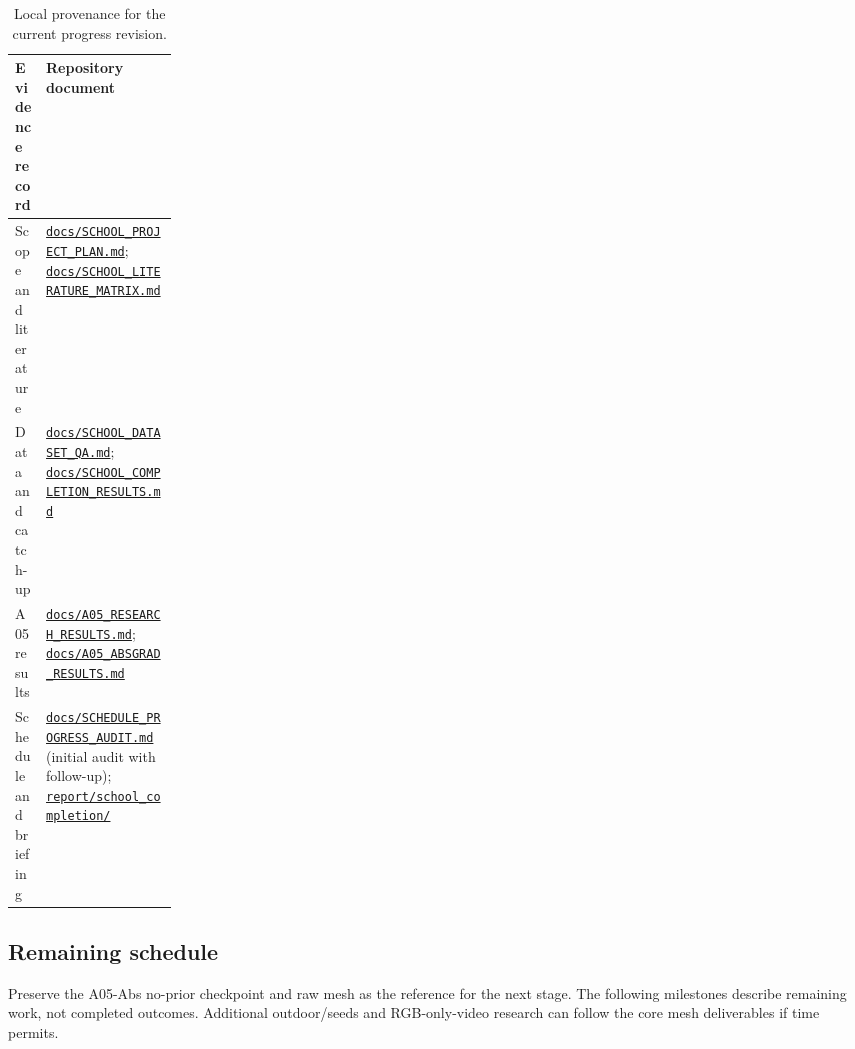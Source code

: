 \documentclass[11pt,a4paper]{article}
\begin{document}
\begin{table}[!ht]
\centering\small
\begin{tabularx}{\linewidth}{@{}p{0.19\linewidth}Y@{}}
\toprule
\textbf{Evidence record} & \textbf{Repository document} \\
\midrule
Scope and literature & \href{run:docs/SCHOOL_PROJECT_PLAN_20261109.md}{\texttt{docs/SCHOOL\_PROJECT\_PLAN.md}};
\href{run:docs/SCHOOL_LITERATURE_MATRIX_20261109.md}{\texttt{docs/SCHOOL\_LITERATURE\_MATRIX.md}} \\
Data and catch-up & \href{run:docs/SCHOOL_DATASET_QA_20261109.md}{\texttt{docs/SCHOOL\_DATASET\_QA.md}};
\href{run:docs/SCHOOL_COMPLETION_RESULTS_20261109.md}{\texttt{docs/SCHOOL\_COMPLETION\_RESULTS.md}} \\
A05 results & \href{run:docs/A05_RESEARCH_RESULTS_20261107.md}{\texttt{docs/A05\_RESEARCH\_RESULTS.md}};
\href{run:docs/A05_ABSGRAD_RESULTS_20261107.md}{\texttt{docs/A05\_ABSGRAD\_RESULTS.md}} \\
Schedule and briefing & \href{run:docs/SCHEDULE_PROGRESS_AUDIT_20261109.md}{\texttt{docs/SCHEDULE\_PROGRESS\_AUDIT.md}}
(initial audit with follow-up); \href{run:report/school_completion_20261109/}{\texttt{report/school\_completion/}} \\
\bottomrule
\end{tabularx}
\caption{Local provenance for the current progress revision.}
\end{table}

\clearpage
\subsection{Remaining schedule}
Preserve the A05-Abs no-prior checkpoint and raw mesh as the reference for
the next stage. The following milestones describe remaining work, not
completed outcomes. Additional outdoor/seeds and RGB-only-video research
can follow the core mesh deliverables if time permits.
\end{document}
